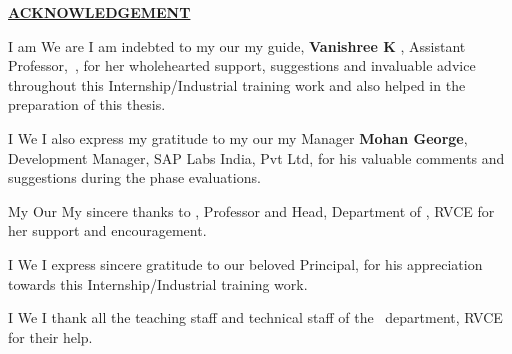 \thispagestyle{empty}

\begin{center}
  \Large\textbf{\underline{ACKNOWLEDGEMENT}} \par
\end{center}

\ifPG I am \else
  \ifStuNameBUsed We are \else I am \fi\fi indebted to \ifPG my \else\ifStuNameBUsed
    our \else my \fi\fi guide, \textbf{Vanishree K} , Assistant Professor, \printGuideOrgA$\,$,
for her wholehearted support, suggestions and invaluable advice throughout this
Internship/Industrial training work and also helped in the preparation of this thesis.\\ \par

\ifPG I \else \ifStuNameBUsed We \else I \fi\fi also express my gratitude to \ifPG
  my \else\ifStuNameBUsed our \else my \fi\fi Manager \textbf{Mohan George},
Development Manager, SAP Labs India, Pvt Ltd, for his valuable comments and
suggestions during the phase evaluations. \\ \par

\ifPG My \else \ifStuNameBUsed Our \else My \fi\fi sincere thanks to \textbf{\printHOD},
Professor and Head, Department of \printDepartmentLF, RVCE for her support and encouragement.\\ \par


\ifPG I \else \ifStuNameBUsed We \else I \fi\fi express sincere gratitude to our beloved Principal, \textbf{\printPrincipal} for his appreciation towards this Internship/Industrial training work.\\ \par

\ifPG I \else\ifStuNameBUsed We \else I \fi\fi thank all the teaching staff and technical staff of the \printDepartmentLF\, department, RVCE for their help.\\ \par

